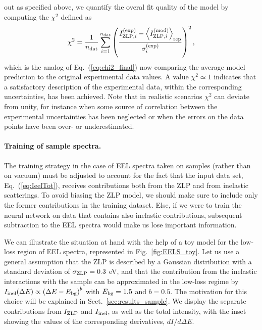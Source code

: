 out as specified above, we quantify the overal fit quality of the model by computing the
$\chi^2$ defined as
\begin{equation}
  \label{eq:chi2_final}
\begin{centering}
  \chi^2 = \frac{1}{n_{\rm dat}}\sum_{i=1}^{n_{dat}}\left(\frac{ I_{{\rm ZLP},i}^{{\rm (exp)}} -
 \la I_{{\rm ZLP},i}^{{\rm (mod)}}\ra_{\rm rep} }{\sigma_i^{(\rm exp)}}\right)^2, 
\end{centering}
\end{equation}
which is the analog of Eq.~(\ref{eq:chi2_final}) now comparing the average model prediction
to the original experimental data values.
%
A value $\chi^2 \simeq 1$ indicates that a satisfactory description of the experimental data,
within the corresponding uncertainties, has been achieved.
%
Note that in realistic scenarios $\chi^2$ can deviate from unity, for instance when
some source of correlation between the experimental uncertainties has been neglected
or when the errors on the data points have been over- or underestimated.


\paragraph{Training of sample spectra.}

The training strategy in the case of EEL spectra taken on samples (rather than on vacuum) must be adjusted
to account for the fact that the input data set, Eq.~(\ref{eq:IeelTot}), receives contributions
both from the ZLP and from inelastic scatterings.
%
To avoid biasing the ZLP model, we should make sure to include only the former contributions 
in the training dataset.
%
Else, if we were to train the neural network on data that contains also inelastic contributions,
subsequent subtraction to the EEL spectra would make us lose important information.

We can illustrate the situation at hand with the help of a toy model for the low-loss
region of EEL spectra, represented in
Fig.~\ref{fig:EELS_toy}.
%
Let us use a general assumption that the ZLP is described by a 
Gaussian distribution with a standard deviation of $\sigma_{\rm ZLP}=0.3$ eV,
and that the contribution from the
inelastic interactions with the sample can be approximated in the low-loss
regime by $I_{\rm inel}(\Delta E)\propto \left( \Delta E - E_{\rm bg}\right)^b$ with $E_{\rm bg}=1.5$
and $b=0.5$. 
%
The motivation for this
choice will be explained in Sect.~\ref{sec:results_sample}.
%
We display the separate contributions from $I_{\rm ZLP}$
and $I_{\rm inel}$, as well as the total intensity,  
with the inset showing the values of the corresponding derivatives, $dI/d\Delta E$.

